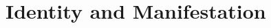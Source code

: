 %
%
%
%
%
%



\part{Identity and Manifestation}
\label{part:identity-and-manifestation}



\def\CurrentPartID{VS.B01.P01}
\def\CurrentPartTitle{Identity and Manifestation}



